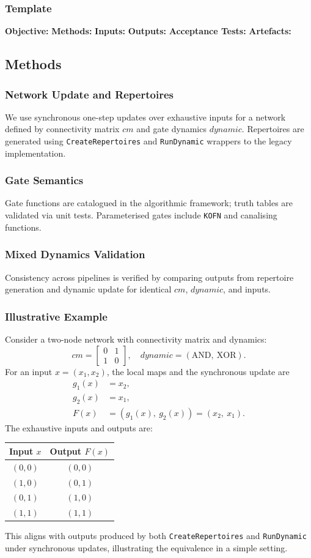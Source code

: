 \subsubsection{Template}
\textbf{Objective:}
\textbf{Methods:}
\textbf{Inputs:}
\textbf{Outputs:}
\textbf{Acceptance Tests:}
\textbf{Artefacts:}
\subsection{Methods}
\subsubsection{Network Update and Repertoires}
We use synchronous one-step updates over exhaustive inputs for a network defined by connectivity matrix \(cm\) and gate dynamics \(dynamic\). Repertoires are generated using \texttt{CreateRepertoires} and \texttt{RunDynamic} wrappers to the legacy implementation.
\subsubsection{Gate Semantics}
Gate functions are catalogued in the algorithmic framework; truth tables are validated via unit tests. Parameterised gates include \texttt{KOFN} and canalising functions.
\subsubsection{Mixed Dynamics Validation}
Consistency across pipelines is verified by comparing outputs from repertoire generation and dynamic update for identical \(cm\), \(dynamic\), and inputs.
\subsubsection{Illustrative Example}
Consider a two-node network with connectivity matrix and dynamics:
\[
cm = \begin{bmatrix}0 & 1\\ 1 & 0\end{bmatrix},\quad dynamic = (\text{AND},\ \text{XOR}).
\]
For an input \(x=(x_1,x_2)\), the local maps and the synchronous update are
\begin{align*}
g_1(x) &= x_2,\\
g_2(x) &= x_1,\\
F(x) &= (g_1(x),\ g_2(x)) = (x_2,\ x_1).
\end{align*}
The exhaustive inputs and outputs are:
\begin{center}
\begin{tabular}{cc}
\toprule
\textbf{Input} $x$ & \textbf{Output} $F(x)$ \\
\midrule
$(0,0)$ & $(0,0)$ \\
$(1,0)$ & $(0,1)$ \\
$(0,1)$ & $(1,0)$ \\
$(1,1)$ & $(1,1)$ \\
\bottomrule
\end{tabular}
\end{center}
This aligns with outputs produced by both \texttt{CreateRepertoires} and \texttt{RunDynamic} under synchronous updates, illustrating the equivalence in a simple setting.
